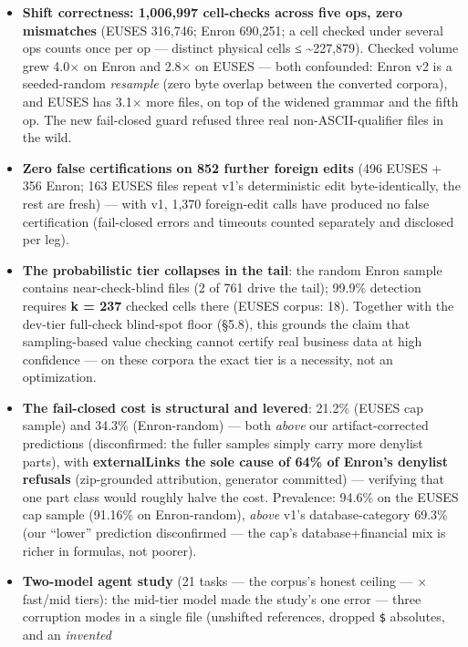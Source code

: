 \documentclass[
  11pt,
]{article}
\providecommand{\tightlist}{%
  \setlength{\itemsep}{0pt}\setlength{\parskip}{0pt}}
\begin{document}
\begin{itemize}
\tightlist
\item
  \textbf{Shift correctness: 1,006,997 cell-checks across five ops, zero
  mismatches} (EUSES 316,746; Enron 690,251; a cell checked under
  several ops counts once per op --- distinct physical cells ≤
  \textasciitilde227,879). Checked volume grew 4.0× on Enron and 2.8× on
  EUSES --- both confounded: Enron v2 is a seeded-random \emph{resample}
  (zero byte overlap between the converted corpora), and EUSES has 3.1×
  more files, on top of the widened grammar and the fifth op. The new
  fail-closed guard refused three real non-ASCII-qualifier files in the
  wild.
\item
  \textbf{Zero false certifications on 852 further foreign edits} (496
  EUSES + 356 Enron; 163 EUSES files repeat v1's deterministic edit
  byte-identically, the rest are fresh) --- with v1, 1,370 foreign-edit
  calls have produced no false certification (fail-closed errors and
  timeouts counted separately and disclosed per leg).
\item
  \textbf{The probabilistic tier collapses in the tail}: the random
  Enron sample contains near-check-blind files (2 of 761 drive the
  tail); 99.9\% detection requires \textbf{k = 237} checked cells there
  (EUSES corpus: 18). Together with the dev-tier full-check blind-spot
  floor (§5.8), this grounds the claim that sampling-based value
  checking cannot certify real business data at high confidence --- on
  these corpora the exact tier is a necessity, not an optimization.
\item
  \textbf{The fail-closed cost is structural and levered}: 21.2\% (EUSES
  cap sample) and 34.3\% (Enron-random) --- both \emph{above} our
  artifact-corrected predictions (disconfirmed: the fuller samples
  simply carry more denylist parts), with \textbf{externalLinks the sole
  cause of 64\% of Enron's denylist refusals} (zip-grounded attribution,
  generator committed) --- verifying that one part class would roughly
  halve the cost. Prevalence: 94.6\% on the EUSES cap sample (91.16\% on
  Enron-random), \emph{above} v1's database-category 69.3\% (our
  ``lower'' prediction disconfirmed --- the cap's database+financial mix
  is richer in formulas, not poorer).
\item
  \textbf{Two-model agent study} (21 tasks --- the corpus's honest
  ceiling --- × fast/mid tiers): the mid-tier model made the study's one
  error --- three corruption modes in a single file (unshifted
  references, dropped \texttt{\$} absolutes, and an \emph{invented}

\end{itemize}
\end{document}
